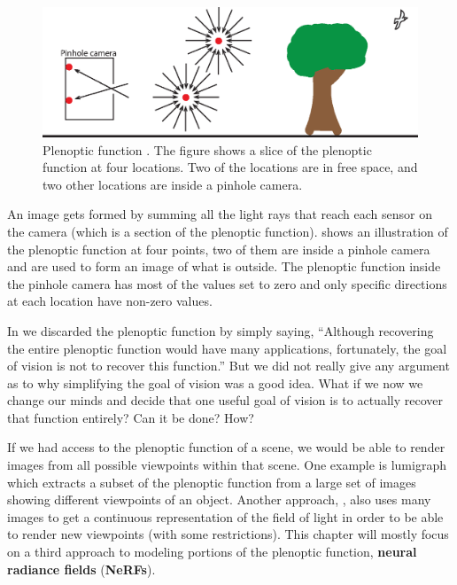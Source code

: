 \begin{figure}[t]
    \centerline{
    \includegraphics[width=1\linewidth]{figures/nerfs/plenoptic_function.eps}
    }
    \caption{Plenoptic function \cite{Adelson91}. 
    The figure shows a slice of the plenoptic function at four locations. Two of the locations are in free space, and two other locations are inside a pinhole camera.}
    \label{fig:nerfs:plenoptic_function}
\end{figure}


An image gets formed by summing all the light rays that reach each sensor on the camera (which is a section of the plenoptic function).  \Fig{\ref{fig:nerfs:plenoptic_function}} shows an illustration of the plenoptic function at four points, two of them are inside a pinhole camera and are used to form an image of what is outside. The plenoptic function inside the pinhole camera has most of the values set to zero and only specific directions at each location have non-zero values. 

In \chap{\ref{chap:challenge_of_vision}} we discarded the plenoptic function by simply saying, ``Although recovering the entire plenoptic function would have many applications, fortunately, the goal of vision is not to recover this function.'' But we did not really give any argument as to why simplifying the goal of vision was a good idea. What if we now we change our minds and decide that one useful goal of vision is to actually recover that function entirely? Can it be done? How?

If we had access to the plenoptic function of a scene, we would be able to render images from all possible viewpoints within that scene. One example is lumigraph  \cite{Gortler1996} which extracts a subset of the plenoptic function from a large set of images showing different viewpoints of an object. Another approach,  \cite{Levoy1996}, also uses many images to get a continuous representation of the field of light in order to be able to render new viewpoints (with some restrictions). This chapter will mostly focus on a third approach to modeling portions of the plenoptic function, \textbf{neural radiance fields} (\textbf{NeRFs}).




